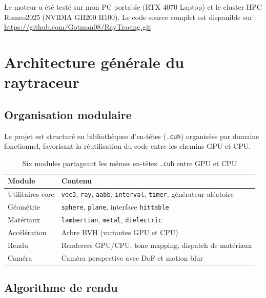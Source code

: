 \documentclass[12pt,a4paper]{article}
\begin{document}
Le moteur a \'{e}t\'{e} test\'{e} sur mon PC portable (RTX 4070 Laptop) et le cluster HPC Romeo2025 (NVIDIA GH200 H100). Le code source complet est disponible sur : \url{https://github.com/Gotman08/RayTracing.git}

\section{Architecture g\'{e}n\'{e}rale du raytraceur}

\subsection{Organisation modulaire}

Le projet est structur\'{e} en biblioth\`{e}ques d'en-t\^{e}tes (\texttt{.cuh}) organis\'{e}es par domaine fonctionnel, favorisant la r\'{e}utilisation du code entre les chemins GPU et CPU.

\begin{table}[H]
\centering
\begin{tabular}{lp{9cm}}
\toprule
\textbf{Module} & \textbf{Contenu} \\
\midrule
Utilitaires core  & \texttt{vec3}, \texttt{ray}, \texttt{aabb}, \texttt{interval}, \texttt{timer}, g\'{e}n\'{e}rateur al\'{e}atoire \\
G\'{e}om\'{e}trie         & \texttt{sphere}, \texttt{plane}, interface \texttt{hittable} \\
Mat\'{e}riaux         & \texttt{lambertian}, \texttt{metal}, \texttt{dielectric} \\
Acc\'{e}l\'{e}ration      & Arbre BVH (variantes GPU et CPU) \\
Rendu             & Renderers GPU/CPU, tone mapping, dispatch de mat\'{e}riaux \\
Cam\'{e}ra            & Cam\'{e}ra perspective avec DoF et motion blur \\
\bottomrule
\end{tabular}
\caption{Six modules partageant les m\^{e}mes en-t\^{e}tes \texttt{.cuh} entre GPU et CPU}
\end{table}

\subsection{Algorithme de rendu}
\end{document}
